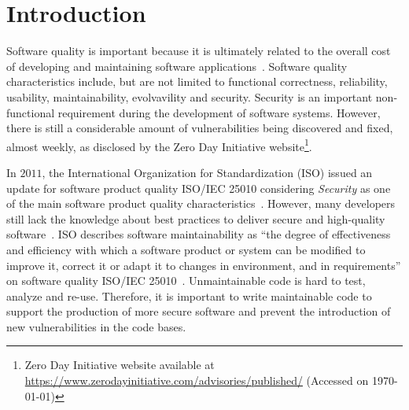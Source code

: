 \documentclass[10pt,conference]{IEEEtran}
\begin{document}
\section{Introduction}
%
Software quality is important because it is ultimately related to the overall
cost of developing and maintaining software applications~\cite{slaughter1998evaluating}. 
Software quality characteristics include, but are not limited to functional correctness,
reliability, usability, maintainability, evolvavility and security. Security is an 
important non-functional requirement during the development of software systems. 
However, there is still a considerable amount of vulnerabilities being
discovered and fixed, almost weekly, as disclosed by the Zero Day Initiative
website\footnote{Zero Day Initiative website available at
\url{https://www.zerodayinitiative.com/advisories/published/} (Accessed on \today{})}.
%

In $2011$, the International Organization for Standardization (ISO) issued an
update for software product quality ISO/IEC 25010 considering \emph{Security} 
as one of the main software product quality characteristics~\cite{iso:2011}. 
However, many developers still lack the knowledge about best practices to deliver 
secure and high-quality software~\cite{Pothamsetty:2005:SEL:1107622.1107635, 8077802}.
ISO describes software maintainability as ``the degree of effectiveness and
efficiency with which a software product or system can be modified to improve
it, correct it or adapt it to changes in environment, and in requirements'' on
software quality ISO/IEC 25010~\cite{iso:2011}. 
Unmaintainable code is hard to test, analyze and re-use. Therefore, 
it is important to write maintainable code to support the production 
of more secure software and prevent 
the introduction of new vulnerabilities in the code bases. 
\end{document}
